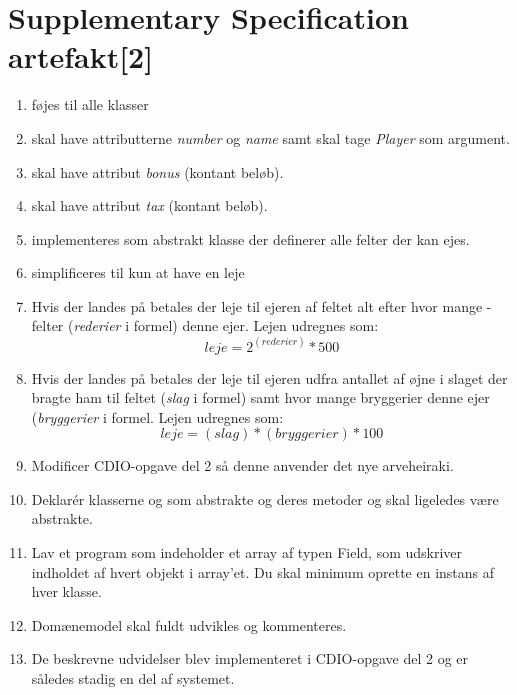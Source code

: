 \chapter{Supplementary Specification artefakt[2]}\label{chap:suppSpec}

\begin{enumerate}
\item {} føjes til alle klasser
\item {} skal have attributterne \textit{number} og \textit{name} samt  skal tage \textit{Player} som argument.
\item {} skal have attribut \textit{bonus} (kontant beløb).
\item {} skal have attribut \textit{tax} (kontant beløb).
\item {} implementeres som abstrakt klasse der definerer alle felter der kan ejes. 
\item {} simplificeres til kun at have en leje 
\item Hvis der landes på  betales der leje til ejeren af feltet alt efter hvor mange -felter (\textit{rederier} i formel) denne ejer. Lejen udregnes som: $$leje=2^{(rederier)}*500$$
\item Hvis der landes på  betales der leje til ejeren udfra antallet af øjne i slaget der bragte ham til feltet (\textit{slag} i formel) samt hvor mange bryggerier denne ejer (\textit{bryggerier} i formel. Lejen udregnes som: $$leje=(slag)*(bryggerier)*100$$
\item Modificer CDIO-opgave del 2 så denne anvender det nye arveheiraki.
\item Deklarér klasserne  og  som abstrakte og deres metoder  og  skal ligeledes være abstrakte.
\item Lav et program  som indeholder et array af typen Field, som udskriver indholdet af hvert objekt i array’et. Du skal minimum oprette en instans af hver klasse.
\item Domænemodel skal fuldt udvikles og kommenteres.  
\item De beskrevne udvidelser blev implementeret i CDIO-opgave del 2 og er således stadig en del af systemet. 
\end{enumerate}
